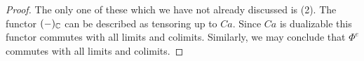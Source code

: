 

\begin{proof}
  The only one of these which we have not already discussed is (2).
  The functor $(-)_{\mathbb{C}}$ can be described as tensoring up to $Ca$.
	Since $Ca$ is dualizable this functor commutes with all limits and colimits. Similarly, we may conclude that $\Phi^e$ commutes with all limits and colimits.
\end{proof}
